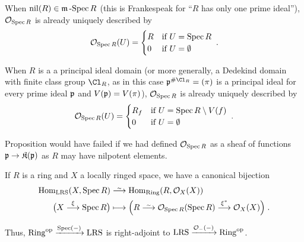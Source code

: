 \documentclass[a4paper,parskip=half,numbers=enddot, DIV=12]{scrreprt}
\begin{document}
\begin{example}
    \begin{alphanumerate}
        \item 
            When $\operatorname{nil}(R)\in \mathfrak{m}\operatorname{-Spec} R$ (this is Frankespeak for ``$R$ has only one prime ideal''), $\mathcal{O}_{\operatorname{Spec} R}$ is already uniquely described by 
            \begin{align*}
            	\mathcal{O}_{\operatorname{Spec} R} (U) = 
            	\begin{cases}
	            	R& \text{if }U=\operatorname{Spec} R\\
	            	0 & \text{if }U=\emptyset
            	\end{cases}\;.
            \end{align*}
        \item 
            When $R$ is a a principal ideal domain (or more generally, a Dedekind domain with finite class group $\Cl_R$, as in this case $\pp^{\#\Cl_R}=(\pi)$ is a principal ideal for every prime ideal $\mathfrak{p}$ and $V(\mathfrak{p})=V(\pi)$), $\mathcal{O}_{\operatorname{Spec} R}$ is already uniquely described by  
            \begin{align*}
            	\mathcal{O}_{\operatorname{Spec} R}(U)= 
            	\begin{cases}
	            	R_f&\text{if }U=\operatorname{Spec} R\setminus V(f)\\
	            	0 &\text{if }U=\emptyset
            	\end{cases} \;.
            \end{align*}
    \end{alphanumerate}
\end{example}
\begin{rem}
    Proposition  would have failed if we had defined $\mathcal{O}_{\operatorname{Spec} R}$ as a sheaf of functions $\pp\morphism \KK(\pp)$ as $R$ may have nilpotent elements.
\end{rem}
\begin{prop}
    If $R$ is a ring and $X$ a locally ringed space, we have a canonical bijection
    \begin{align*}
        \Hom_{\cat{LRS}}(X,\Spec R) &\isomorphism \Hom_{\cat{Ring}}(R,\Oo_X(X))\\
        \big(X\morphism[\xi] \Spec R\big) &\longmapsto \Big(R\isomorphism \Oo_{\Spec R}(\Spec R) \morphism[\xi^*] \Oo_X(X)\Big)\;.
    \end{align*}
\end{prop}
\begin{rem*}
    Thus, $\operatorname{Ring}^{\mathrm{op}} \xrightarrow{\operatorname{Spec}(-)} \operatorname{LRS}$ is right-adjoint to $\operatorname{LRS} \xrightarrow{\mathcal{O}_-(-)} \operatorname{Ring}^{\mathrm{op}}$.
\end{rem*}
\end{document}
